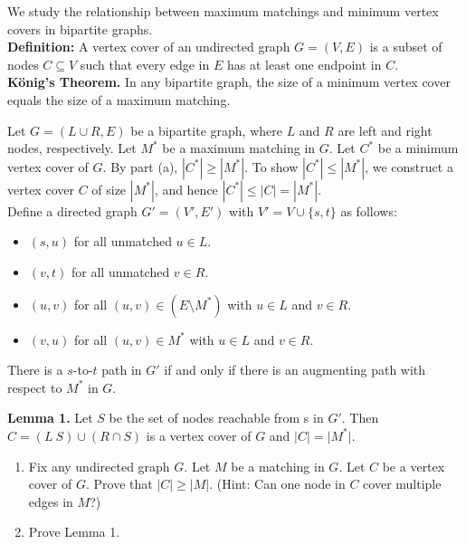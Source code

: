 \documentclass{cs0500}
\begin{document}
\maketitle


\begin{problem}
    We study the relationship between maximum matchings and minimum vertex covers in bipartite graphs.
    \\ \textbf{Definition: } A vertex cover of an undirected graph $G = (V, E)$ is a subset of nodes $C \subseteq V$ such that every edge in $E$ has at least one endpoint in $C$. 
    \\ \textbf{König’s Theorem.} In any bipartite graph, the size of a minimum vertex cover equals the size of a maximum matching.

    \medskip 
    Let $G = (L \cup R, E)$ be a bipartite graph, where $L$ and $R$ are left and right nodes, respectively. Let $M^*$ be a maximum matching in $G$. Let $C^*$ be a minimum vertex cover of $G$. By part (a), $|C^*| \ge |M^*|$. To show $|C^*| \le |M^*|$, we construct a vertex cover $C$ of size $|M^*|$, and hence $|C^*| \le |C| = |M^*|$.
    \medskip 
    \\ Define a directed graph $G'=(V',E')$ with $V'=V\cup\{s,t\}$ as follows:
    \begin{itemize}
    \item $(s, u)$ for all unmatched $u \in L$.
    \item $(v, t)$ for all unmatched $v \in R$.
    \item $(u, v)$ for all $(u, v) \in (E \setminus M^*)$ with $u \in L$ and $v \in R$.
    \item $(v, u)$ for all $(u, v) \in M^*$ with $u \in L$ and $v \in R$.
    \end{itemize}

    There is a $s$-to-$t$ path in $G'$ if and only if there is an augmenting path with respect to $M^*$ in $G$.

    \textbf{Lemma 1. } Let $S$ be the set of nodes reachable from s in $G'$. Then $C = (L \ S) \cup (R \cap S)$ is a vertex cover of $G$ and $\vert C \vert = \vert M^* \vert$.
    \begin{enumerate}
        \item [(a)] Fix any undirected graph $G$. Let $M$ be a matching in $G$. Let $C$ be a vertex cover of $G$. Prove that $\vert C \vert \geq \vert M \vert$. (Hint: Can one node in $C$ cover multiple edges in $M$?)
        \item [(b)] Prove Lemma 1.
    \end{enumerate}
\end{problem}
\begin{solution}
    
\end{solution}
\end{document}
